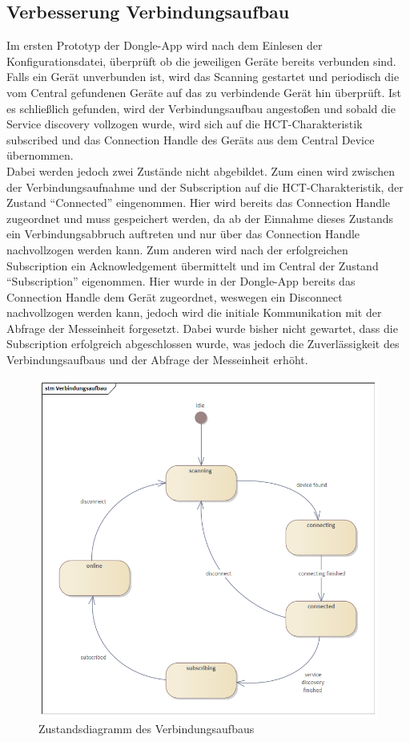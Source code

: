 \subsection{Verbesserung Verbindungsaufbau}
Im ersten Prototyp der Dongle-App wird nach dem Einlesen der Konfigurationsdatei, überprüft ob die jeweiligen Geräte bereits verbunden sind. Falls ein Gerät unverbunden ist, wird das Scanning gestartet und periodisch die vom Central gefundenen Geräte auf das zu verbindende Gerät hin überprüft. Ist es schließlich gefunden, wird der Verbindungsaufbau angestoßen und sobald die Service discovery vollzogen wurde, wird sich auf die HCT-Charakteristik subscribed und das Connection Handle des Geräts aus dem Central Device übernommen. \\
Dabei werden jedoch zwei Zustände nicht abgebildet. Zum einen wird zwischen der Verbindungsaufnahme und der Subscription auf die HCT-Charakteristik, der Zustand ``Connected'' eingenommen. Hier wird bereits das Connection Handle zugeordnet und muss gespeichert werden, da ab der Einnahme dieses Zustands ein Verbindungsabbruch auftreten und nur über das Connection Handle nachvollzogen werden kann. Zum anderen wird nach der erfolgreichen Subscription ein Acknowledgement übermittelt und im Central der Zustand ``Subscription'' eigenommen. Hier wurde in der Dongle-App bereits das Connection Handle dem Gerät zugeordnet, weswegen ein Disconnect nachvollzogen werden kann, jedoch wird die initiale Kommunikation mit der Abfrage der Messeinheit forgesetzt. Dabei wurde bisher nicht gewartet, dass die Subscription erfolgreich abgeschlossen wurde, was jedoch die Zuverlässigkeit des Verbindungsaufbaus und der Abfrage der Messeinheit erhöht.

\begin{figure}[H] 
	\centering
	\includegraphics[width=\textwidth]{figures/Verbindungsaufbau.png}
	\caption{Zustandsdiagramm des Verbindungsaufbaus}
\end{figure}




